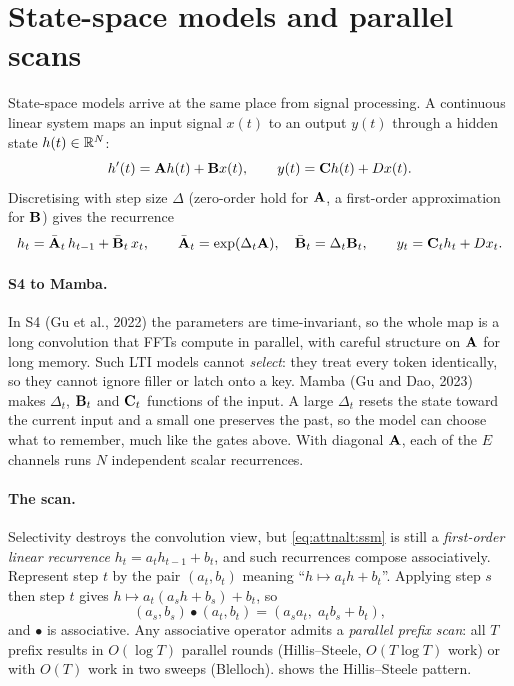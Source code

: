 \section{State-space models and parallel scans}\label{sec:attnalt:ssm}

State-space models arrive at the same place from signal processing. A continuous linear system maps an
input signal $x(t)$ to an output $y(t)$ through a hidden state $h(t)\in\mathbb{R}^N$:
\[
h'(t)=\mathbf{A}h(t)+\mathbf{B}x(t),\qquad y(t)=\mathbf{C}h(t)+Dx(t).
\]
Discretising with step size $\Delta$ (zero-order hold for $\mathbf{A}$, a first-order approximation for
$\mathbf{B}$) gives the recurrence
\begin{equation}
h_t=\bar{\mathbf{A}}_t\,h_{t-1}+\bar{\mathbf{B}}_t\,x_t,\qquad \bar{\mathbf{A}}_t=\exp(\Delta_t\mathbf{A}),\quad
\bar{\mathbf{B}}_t=\Delta_t\mathbf{B}_t,\qquad y_t=\mathbf{C}_th_t+Dx_t .
\label{eq:attnalt:ssm}
\end{equation}

\paragraph{S4 to Mamba.} In S4 (Gu et al., 2022) the parameters are time-invariant, so the whole map is a
long convolution that FFTs compute in parallel, with careful structure on $\mathbf{A}$ for long memory. Such
LTI models cannot \emph{select}: they treat every token identically, so they cannot ignore filler or
latch onto a key. Mamba (Gu and Dao, 2023) makes $\Delta_t$, $\mathbf{B}_t$ and $\mathbf{C}_t$ functions of the
input. A large $\Delta_t$ resets the state toward the current input and a small one preserves the past, so
the model can choose what to remember, much like the gates above. With diagonal $\mathbf{A}$, each of the $E$
channels runs $N$ independent scalar recurrences.

\paragraph{The scan.} Selectivity destroys the convolution view, but \cref{eq:attnalt:ssm} is still a
\emph{first-order linear recurrence} $h_t=a_th_{t-1}+b_t$, and such recurrences compose associatively.
Represent step $t$ by the pair $(a_t,b_t)$ meaning ``$h\mapsto a_th+b_t$''. Applying step $s$ then step $t$
gives $h\mapsto a_t(a_sh+b_s)+b_t$, so
\begin{equation}
(a_s,b_s)\bullet(a_t,b_t)=(a_sa_t,\;a_tb_s+b_t),
\label{eq:attnalt:scanop}
\end{equation}
and $\bullet$ is associative. Any associative operator admits a \emph{parallel prefix scan}: all $T$ prefix
results in $O(\log T)$ parallel rounds (Hillis--Steele, $O(T\log T)$ work) or with $O(T)$ work in two sweeps
(Blelloch).  shows the Hillis--Steele pattern.

